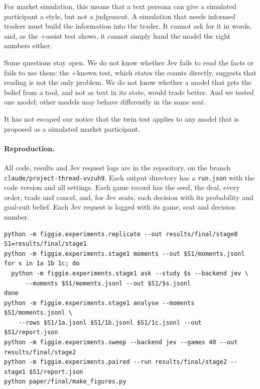 \documentclass[10pt]{article}
\begin{document}
For market simulation, this means that a text persona can give a simulated participant a style, but not a
judgement. A simulation that needs informed traders must build the information into the trader. It cannot ask for it
in words, and, as the +assist test shows, it cannot simply hand the model the right numbers either.

Some questions stay open. We do not know whether Jev fails to read the facts or fails to use them: the +known test,
which states the counts directly, suggests that reading is not the only problem. We do not know whether a model that
gets the belief from a tool, and not as text in its state, would trade better. And we tested one model; other models
may behave differently in the same seat.

It has not escaped our notice that the twin test applies to any model that is proposed as a simulated market
participant.

\paragraph{Reproduction.} All code, results and Jev request logs are in the repository, on the branch
\nolinkurl{claude/project-thread-vvzuh9}. Each output directory has a \texttt{run.json} with the code version and all
settings. Each game record has the seed, the deal, every order, trade and cancel, and, for Jev seats, each decision
with its probability and goal-suit belief. Each Jev request is logged with its game, seat and decision number.
{\small
\begin{verbatim}
python -m figgie.experiments.replicate --out results/final/stage0
S1=results/final/stage1
python -m figgie.experiments.stage1 moments --out $S1/moments.jsonl
for s in 1a 1b 1c; do
  python -m figgie.experiments.stage1 ask --study $s --backend jev \
      --moments $S1/moments.jsonl --out $S1/$s.jsonl
done
python -m figgie.experiments.stage1 analyse --moments $S1/moments.jsonl \
    --rows $S1/1a.jsonl $S1/1b.jsonl $S1/1c.jsonl --out $S1/report.json
python -m figgie.experiments.sweep --backend jev --games 40 --out results/final/stage2
python -m figgie.experiments.paired --run results/final/stage2 --stage1 $S1/report.json
python paper/final/make_figures.py
\end{verbatim}
}
\end{document}
